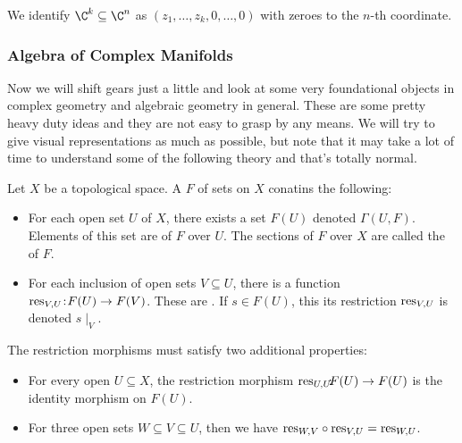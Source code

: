 We identify $\C^k \subseteq \C^n$ as $(z_1, \hdots, z_k, 0, \hdots, 0)$ with zeroes
to the $n$-th coordinate.\\

\subsubsection{Algebra of Complex Manifolds}
Now we will shift gears just a little and look at some very foundational objects in 
complex geometry and algebraic geometry in general. These are some pretty heavy duty
ideas and they are not easy to grasp by any means. We will try to give visual representations
as much as possible, but note that it may take a lot of time to understand some of
the following theory and that's totally normal.\\

\begin{definition}
    Let $X$ be a topological space. A  $F$ of sets on $X$ conatins
    the following:
    \begin{itemize}
        \item For each open set $U$ of $X$, there exists a set $F(U)$ denoted
        $\Gamma(U,F)$. Elements of this set are  of $F$ over $U$.
        The sections of $F$ over $X$ are called the  of $F$.
        \item For each inclusion of open sets $V \subseteq U$, there is a function
        $\textnormal{res}_{V,U} \hspace{-2pt}: \hspace{-2pt}F(U) \to F(V)$. These are .
        If $s \in F(U)$, this its restriction $\textnormal{res}_{V,U}$ is denoted $s \mid_V$.
    \end{itemize}
    The restriction morphisms must satisfy two additional properties:
    \begin{itemize}
        \item For every open $U \subseteq X$, the restriction morphism
        $\textnormal{res}_{U,U} \hspace{-5pt}:\hspace{-5pt} F(U) \to F(U)$ is the identity morphism on $F(U)$.
        \item For three open sets $W \subseteq V \subseteq U$, then we have
        $\textnormal{res}_{W,V} \circ \textnormal{res}_{V,U} = \textnormal{res}_{W,U}$.
    \end{itemize}
\end{definition}

